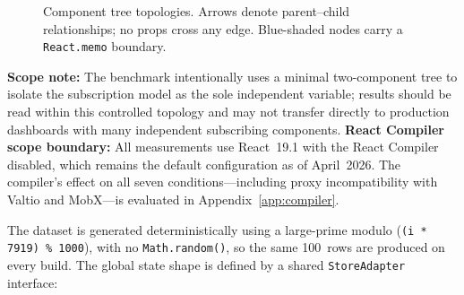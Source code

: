 \documentclass[conference]{IEEEtran}
\newcommand{\code}[1]{\texttt{\small #1}}
\begin{document}
\begin{figure}[tb]
\centering
{}
\caption{Component tree topologies. Arrows denote parent--child
  relationships; no props cross any edge.
  Blue-shaded nodes carry a \code{React.memo} boundary.}
\label{fig:trees}
\end{figure}

\textbf{Scope note:} The benchmark intentionally uses a minimal
two-component tree to isolate the subscription model as the sole
independent variable; results should be read within this controlled
topology and may not transfer directly to production dashboards with
many independent subscribing components.
\textbf{React Compiler scope boundary:} All measurements use
React~19.1 with the React Compiler~\cite{b13} disabled, which
remains the default configuration as of April~2026. The compiler's
effect on all seven conditions---including proxy incompatibility with
Valtio and MobX---is evaluated in Appendix~\ref{app:compiler}.

The dataset is generated deterministically using a large-prime modulo
(\code{(i * 7919) \% 1000}), with no \code{Math.random()}, so the same
100~rows are produced on every build. The global state shape is defined
by a shared \code{StoreAdapter} interface:
\end{document}
